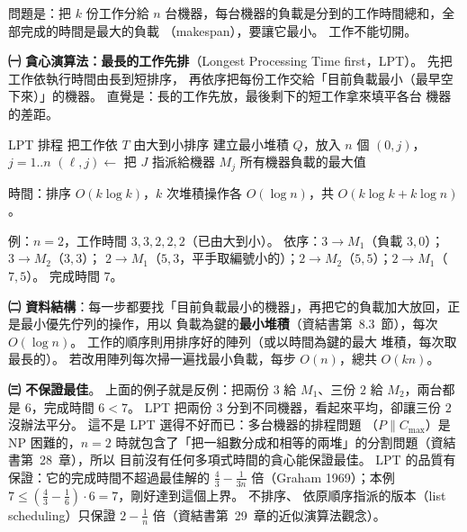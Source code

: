 \begin{pastsoln}
問題是：把 $k$ 份工作分給 $n$ 台機器，每台機器的負載是分到的工作時間總和，全部完成的時間是最大的負載
（makespan），要讓它最小。 工作不能切開。

\textbf{㈠ 貪心演算法：最長的工作先排}（Longest Processing Time first，LPT）。 先把工作依執行時間由長到短排序，
再依序把每份工作交給「目前負載最小（最早空下來）」的機器。 直覺是：長的工作先放，最後剩下的短工作拿來填平各台
機器的差距。
\begin{pseudo}{LPT 排程}
 
    \State 把工作依 $T$ 由大到小排序
    \State 建立最小堆積 $Q$，放入 $n$ 個 $(0, j)$，$j = 1..n$ 
        \State $(\ell, j) \gets$  
        \State 把 $J$ 指派給機器 $M_j$
        \State {}
    \EndFor
    \State \Return 所有機器負載的最大值 
\EndFunction
\end{pseudo}
時間：排序 $O(k \log k)$，$k$ 次堆積操作各 $O(\log n)$，共 $O(k \log k + k \log n)$。

例：$n = 2$，工作時間 $3, 3, 2, 2, 2$（已由大到小）。 依序：$3 \to M_1$（負載 $3, 0$）；$3 \to M_2$（$3, 3$）；
$2 \to M_1$（$5, 3$，平手取編號小的）；$2 \to M_2$（$5, 5$）；$2 \to M_1$（$7, 5$）。 完成時間 $7$。

\textbf{㈡ 資料結構}：每一步都要找「目前負載最小的機器」，再把它的負載加大放回，正是最小優先佇列的操作，用以
負載為鍵的\textbf{最小堆積}（資結書第~8.3~節），每次 $O(\log n)$。 工作的順序則用排序好的陣列（或以時間為鍵的最大
堆積，每次取最長的）。 若改用陣列每次掃一遍找最小負載，每步 $O(n)$，總共 $O(kn)$。

\textbf{㈢ 不保證最佳}。 上面的例子就是反例：把兩份 $3$ 給 $M_1$、三份 $2$ 給 $M_2$，兩台都是 $6$，完成時間 $6 < 7$。
LPT 把兩份 $3$ 分到不同機器，看起來平均，卻讓三份 $2$ 沒辦法平分。 這不是 LPT 選得不好而已：多台機器的排程問題
（$P \| C_{\max}$）是 NP 困難的，$n = 2$ 時就包含了「把一組數分成和相等的兩堆」的分割問題（資結書第~28~章），所以
目前沒有任何多項式時間的貪心能保證最佳。 LPT 的品質有保證：它的完成時間不超過最佳解的
$\frac{4}{3} - \frac{1}{3n}$ 倍（Graham 1969）；本例 $7 \le (\frac{4}{3} - \frac{1}{6}) \cdot 6 = 7$，剛好達到這個上界。 不排序、
依原順序指派的版本（list scheduling）只保證 $2 - \frac{1}{n}$ 倍（資結書第~29~章的近似演算法觀念）。
\end{pastsoln}
